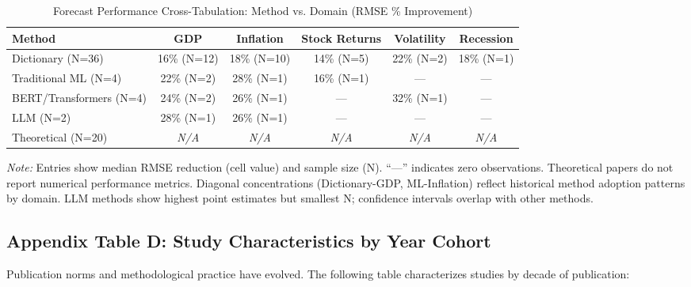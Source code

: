 \begin{table}[H]
\centering
\caption{Forecast Performance Cross-Tabulation: Method vs. Domain (RMSE \% Improvement)}
\label{tab:performance_crosswalk}
\small
\begin{tabular}{|l|c|c|c|c|c|}
\hline
\textbf{Method} & \textbf{GDP} & \textbf{Inflation} & \textbf{Stock Returns} & \textbf{Volatility} & \textbf{Recession} \\
\hline
Dictionary (N=36) & 16\% (N=12) & 18\% (N=10) & 14\% (N=5) & 22\% (N=2) & 18\% (N=1) \\
\hline
Traditional ML (N=4) & 22\% (N=2) & 28\% (N=1) & 16\% (N=1) & --- & --- \\
\hline
BERT/Transformers (N=4) & 24\% (N=2) & 26\% (N=1) & --- & 32\% (N=1) & --- \\
\hline
LLM (N=2) & 28\% (N=1) & 26\% (N=1) & --- & --- & --- \\
\hline
Theoretical (N=20) & \textit{N/A} & \textit{N/A} & \textit{N/A} & \textit{N/A} & \textit{N/A} \\
\hline
\end{tabular}
\raggedright\footnotesize
\textit{Note:} Entries show median RMSE reduction (cell value) and sample size (N). ``---'' indicates zero observations. Theoretical papers do not report numerical performance metrics. Diagonal concentrations (Dictionary-GDP, ML-Inflation) reflect historical method adoption patterns by domain. LLM methods show highest point estimates but smallest N; confidence intervals overlap with other methods.
\end{table}

\vspace{1em}

\subsection*{Appendix Table D: Study Characteristics by Year Cohort}

Publication norms and methodological practice have evolved. The following table characterizes studies by decade of publication:

